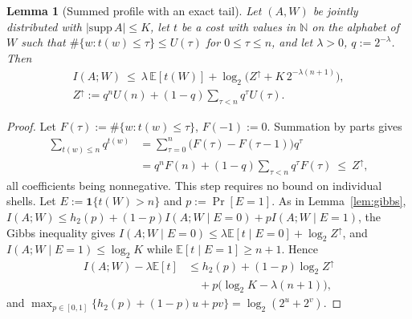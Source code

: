 \documentclass[aps,prx,twocolumn,superscriptaddress,nofootinbib,longbibliography]{revtex4-2}
\theoremstyle{plain}
\newtheorem{lemma}{Lemma}
\theoremstyle{definition}
\theoremstyle{remark}
\newcommand{\E}{\mathbb{E}}
\begin{document}
\begin{lemma}[Summed profile with an exact tail]\label{lem:gibbs2}
Let $(A,W)$ be jointly distributed with $|\mathrm{supp}\,A|\le K$, let $t$ be a cost with values in $\mathbb N$ on the alphabet of $W$ such that $\#\{w:t(w)\le\tau\}\le U(\tau)$ for $0\le\tau\le n$, and let $\lambda>0$, $q:=2^{-\lambda}$. Then
\begin{multline}
I(A;W)\ \le\ \lambda\,\E[t(W)]+\log_2\!\big(Z^\uparrow+K\,2^{-\lambda(n+1)}\big),\\
Z^\uparrow:=q^nU(n)+(1-q)\sum_{\tau<n}q^\tau U(\tau).
\end{multline}
\end{lemma}
\begin{proof}
Let $F(\tau):=\#\{w:t(w)\le\tau\}$, $F(-1):=0$. Summation by parts gives
\[\begin{aligned}\sum_{t(w)\le n}q^{t(w)}&=\sum_{\tau=0}^n\big(F(\tau)-F(\tau-1)\big)q^\tau\\&=q^nF(n)+(1-q)\sum_{\tau<n}q^\tau F(\tau)\ \le\ Z^\uparrow,\end{aligned}\]
all coefficients being nonnegative. This step requires no bound on individual shells. Let $E:=\mathbf1\{t(W)>n\}$ and $p:=\Pr[E=1]$. As in Lemma~\ref{lem:gibbs}, $I(A;W)\le h_2(p)+(1-p)I(A;W\mid E=0)+pI(A;W\mid E=1)$, the Gibbs inequality gives $I(A;W\mid E=0)\le\lambda\E[t\mid E=0]+\log_2Z^\uparrow$, and $I(A;W\mid E=1)\le\log_2K$ while $\E[t\mid E=1]\ge n+1$. Hence
\[\begin{aligned}I(A;W)-\lambda\E[t]&\le h_2(p)+(1-p)\log_2Z^\uparrow\\&\quad+p\big(\log_2K-\lambda(n+1)\big),\end{aligned}\]
and $\max_{p\in[0,1]}\{h_2(p)+(1-p)u+pv\}=\log_2(2^u+2^v)$.
\end{proof}
\end{document}
